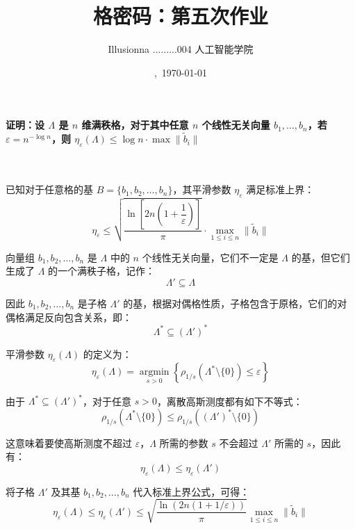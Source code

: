 \documentclass{article}
\title{格密码：第五次作业}
\author{Illusionna \quad 2025.........004 \quad 人工智能学院}
\date{\currenttime,\ \today}
\begin{document}
\maketitle



\paragraph*{证明：设 $\Lambda$ 是 $n$ 维满秩格，对于其中任意 $n$ 个线性无关向量 $b_1,\dots,b_n$，若 $\varepsilon = n^{-\log n}$，则 $\eta_\varepsilon(\Lambda) \leqslant \log n \cdot \max \|\tilde{b}_i\|$}~{\\}

已知对于任意格的基 $B=\{b_1,b_2,\ldots,b_n\}$，其平滑参数 $\eta_{\varepsilon}$ 满足标准上界：
\[ \eta_{\varepsilon}\leqslant\sqrt{\displaystyle\dfrac{\ln\left[2n\left(1+\dfrac{1}{\varepsilon}\right)\right]}{\pi}}\cdot\max_{1 \leqslant i \leqslant n} \|\tilde{b}_i\| \]

向量组 $b_1,b_2,\ldots,b_n$ 是 $\Lambda$ 中的 $n$ 个线性无关向量，它们不一定是 $\Lambda$ 的基，但它们生成了 $\Lambda$ 的一个满秩子格，记作：
\[ \Lambda'\subseteq\Lambda \]

因此 $b_1,b_2,\ldots,b_n$ 是子格 $\Lambda'$ 的基，根据对偶格性质，子格包含于原格，它们的对偶格满足反向包含关系，即：
\[ \Lambda^{*}\subseteq(\Lambda')^{*} \]

平滑参数 $\eta_\varepsilon(\Lambda)$ 的定义为：
\[ \eta_\varepsilon(\Lambda)=\mathop{\arg\min}\limits_{s>0}\left\{\rho_{1/s}(\Lambda^* \setminus \{0\}) \leqslant \varepsilon\right\} \]

由于 $\Lambda^{*}\subseteq(\Lambda')^{*}$，对于任意 $s>0$，离散高斯测度都有如下不等式：
\[ \rho_{1/s}(\Lambda^* \setminus \{0\}) \leqslant \rho_{1/s}((\Lambda')^* \setminus \{0\}) \]

这意味着要使高斯测度不超过 $\varepsilon$，$\Lambda$ 所需的参数 $s$ 不会超过 $\Lambda'$ 所需的 $s$，因此有：
\[ \eta_\varepsilon(\Lambda) \leqslant \eta_\varepsilon(\Lambda') \]

将子格 $\Lambda'$ 及其基 $b_1,b_2, \ldots, b_n$ 代入标准上界公式，可得：
\[ \eta_\varepsilon(\Lambda) \leqslant \eta_\varepsilon(\Lambda') \leqslant \sqrt{\dfrac{\ln(2n(1+1/\varepsilon))}{\pi}} \max_{1 \leqslant i \leqslant n} \|\tilde{b}_i\| \]
\end{document}
